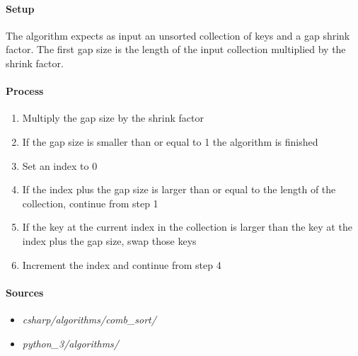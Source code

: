\documentclass{article}
\begin{document}
\paragraph{Setup}
The algorithm expects as input an unsorted collection of keys and a gap shrink factor. The first gap size is the
length of the input collection multiplied by the shrink factor.

\paragraph{Process}
\begin{enumerate}
\item{Multiply the gap size by the shrink factor}
\item{If the gap size is smaller than or equal to 1 the algorithm is finished}
\item{Set an index to 0}
\item{If the index plus the gap size is larger than or equal to the length of the collection, continue from step 1}
\item{If the key at the current index in the collection is larger than the key at the index plus the gap size,
  swap those keys}
\item{Increment the index and continue from step 4}
\end{enumerate}

\paragraph{Sources}
\begin{itemize}
\item{{\em csharp/algorithms/comb\_sort/}}
\item{{\em python\_3/algorithms/}}
\end{itemize}

\end{document}
